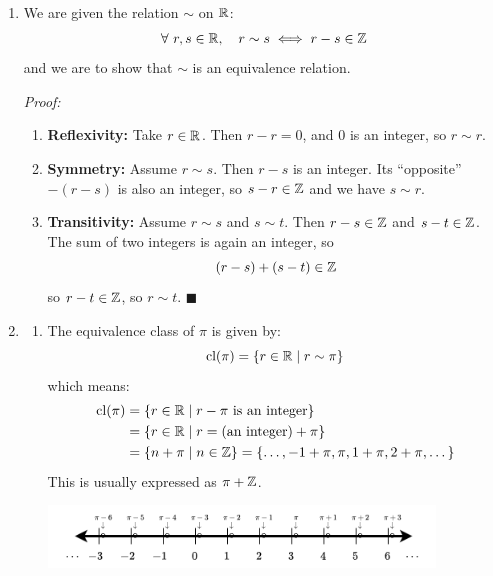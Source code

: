 \begin{enumerate}
    \item We are given the relation $\sim$ on ${\mathbb{ R}}$:  
          \[
          \forall \ r,s \in {\mathbb{ R}}, \quad r \sim s \iff r - s \in {\mathbb{ Z}}
          \]
          and we are to show that $\sim$ is an equivalence relation.

          \textit{Proof:}  
          \begin{enumerate}
              \item \textbf{Reflexivity:} Take $r \in {\mathbb{ R}}$. Then $r - r = 0$, and $0$ is an integer, so $r \sim r$.
              \item \textbf{Symmetry:} Assume $r \sim s$. Then $r - s$ is an integer.  
              Its ``opposite'' $-(r - s)$ is also an integer, so $s - r \in {\mathbb{ Z}}$ and we have $s \sim r$.
              \item \textbf{Transitivity:} Assume $r \sim s$ and $s \sim t$.  
              Then $r - s \in {\mathbb{ Z}}$ and $s - t \in {\mathbb{ Z}}$. The sum of two integers is again an integer, so  
              \[
              (r - s) + (s - t) \in {\mathbb{ Z}}
              \]
              so $r - t \in {\mathbb{ Z}}$, so $r \sim t$. $\blacksquare$
          \end{enumerate}

    \item \begin{enumerate}
              \item The equivalence class of $\pi$ is given by:
                    \[
                    \text{cl}(\pi) = \{ r \in {\mathbb{ R}} \mid r \sim \pi \}
                    \]
                    which means:
                    \begin{align*}
                        \text{cl}(\pi) &= \{ r \in {\mathbb{ R}} \mid r - \pi \text{ is an integer} \} \\
                        &= \{ r \in {\mathbb{ R}} \mid r = ( \text{an integer} ) + \pi \} \\
                        &= \{ n + \pi \mid n \in {\mathbb{ Z}} \} = \{ \dots, -1+\pi, \pi, 1+\pi, 2+\pi, \dots \}
                    \end{align*}
                    This is usually expressed as $\pi + {\mathbb{ Z}}$.
                    \begin{center}
                        \hspace{-0.1in}\includegraphics[width=0.85\textwidth]{Figures/EquivClassOfPiNumberLine.png}
                    \end{center}


\end{enumerate}
\end{enumerate}
